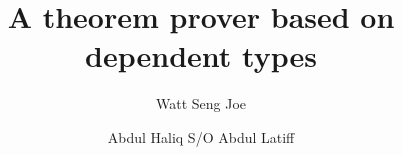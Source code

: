 \documentclass{beamer}
\title[A theorem prover based on dependent types]{A theorem prover based on dependent types}
\author{Watt Seng Joe \and Abdul Haliq S/O Abdul Latiff}
\begin{document}
\frame{\titlepage}
\end{document}
